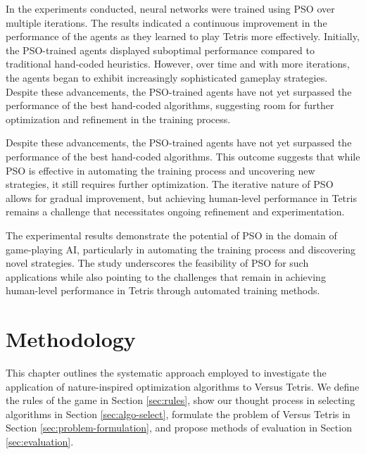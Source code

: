 \documentclass[a4paper, 12pt]{extreport}
\begin{document}
				In the experiments conducted, neural networks were trained using PSO over multiple iterations. The results indicated a continuous improvement in the performance of the agents as they learned to play Tetris more effectively. Initially, the PSO-trained agents displayed suboptimal performance compared to traditional hand-coded heuristics. However, over time and with more iterations, the agents began to exhibit increasingly sophisticated gameplay strategies. Despite these advancements, the PSO-trained agents have not yet surpassed the performance of the best hand-coded algorithms, suggesting room for further optimization and refinement in the training process.
				
				Despite these advancements, the PSO-trained agents have not yet surpassed the performance of the best hand-coded algorithms. This outcome suggests that while PSO is effective in automating the training process and uncovering new strategies, it still requires further optimization. The iterative nature of PSO allows for gradual improvement, but achieving human-level performance in Tetris remains a challenge that necessitates ongoing refinement and experimentation.
				
				The experimental results demonstrate the potential of PSO in the domain of game-playing AI, particularly in automating the training process and discovering novel strategies. The study underscores the feasibility of PSO for such applications while also pointing to the challenges that remain in achieving human-level performance in Tetris through automated training methods.
	
	\chapter{Methodology}
	
		
		This chapter outlines the systematic approach employed to investigate the application of nature-inspired optimization algorithms to Versus Tetris. We define the rules of the game in Section \ref{sec:rules}, show our thought process in selecting algorithms in Section \ref{sec:algo-select}, formulate the problem of Versus Tetris in Section \ref{sec:problem-formulation}, and propose methods of evaluation in Section \ref{sec:evaluation}.
		
\end{document}
